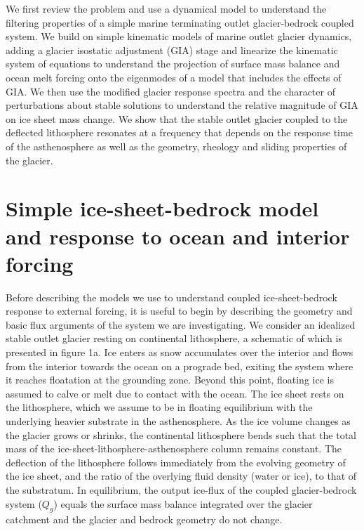 \documentclass[tc, manuscript]{copernicus}
\begin{document}
We first review the problem and use a dynamical model to understand the filtering properties of a simple marine terminating outlet glacier-bedrock coupled system. We build on simple kinematic models of marine outlet glacier dynamics, adding a glacier isostatic adjustment (GIA) stage and linearize the kinematic system of equations to understand the projection of surface mass balance and ocean melt forcing onto the eigenmodes of a model that includes the effects of GIA. 
We then use the modified glacier response spectra and the character of perturbations about stable solutions to understand the relative magnitude of GIA on ice sheet mass change.
We show that the stable outlet glacier coupled to the deflected lithosphere resonates at a frequency that depends on the response time of the asthenosphere as well as the geometry, rheology and sliding properties of the glacier.

\section{Simple ice-sheet-bedrock model and response to ocean and interior forcing}

Before describing the models we use to understand coupled ice-sheet-bedrock response to external forcing, it is useful to begin by describing the geometry and basic flux arguments of the system we are investigating. We consider an idealized stable outlet glacier resting on continental lithosphere, a schematic of which is presented in figure 1a. 
Ice enters as snow accumulates over the interior and flows from the interior towards the ocean on a prograde bed, exiting the system where it reaches floatation at the grounding zone. Beyond this point, floating ice is assumed to calve or melt due to contact with the ocean. 
The ice sheet rests on the lithosphere, which we assume to be in floating equilibrium with the underlying heavier substrate in the asthenosphere. As the ice volume changes as the glacier grows or shrinks, the continental lithosphere bends such that the total mass of the ice-sheet-lithosphere-asthenosphere column remains constant.
The deflection of the lithosphere follows immediately from the evolving geometry of the ice sheet, and the ratio of the overlying fluid density (water or ice), to that of the substratum.
In equilibrium, the output ice-flux of the coupled glacier-bedrock system ($Q_g$) equals the surface mass balance integrated over the glacier catchment and the glacier and bedrock geometry do not change.
\end{document}
